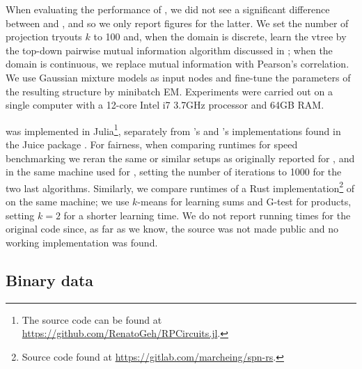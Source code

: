 When evaluating the performance of , we did not see a significant difference
between  and , and so we only report figures for the latter.
We set the number of projection tryouts $k$ to 100 and, when the domain is discrete, learn the
vtree by the top-down pairwise mutual information algorithm discussed in ; when
the domain is continuous, we replace mutual information with Pearson's correlation. We use Gaussian
mixture models as input nodes and fine-tune the parameters of the resulting structure by minibatch
EM. Experiments were carried out on a single computer with a 12-core Intel i7 3.7GHz processor and
64GB RAM.

 was implemented in Julia\footnote{The source code can be found at
\url{https://github.com/RenatoGeh/RPCircuits.jl}.}, separately from 's and
's implementations found in the Juice package \citep{dang21}. For fairness,
when comparing runtimes for speed benchmarking we reran the same or similar setups as originally
reported for ,  and  in the same machine used
for , setting the number of iterations to 1000 for the two last \incrclass{}
algorithms. Similarly, we compare runtimes of a Rust implementation\footnote{Source code found at
\url{https://gitlab.com/marcheing/spn-rs}.} of  on the same machine; we use
$k$-means for learning sums and G-test for products, setting $k=2$ for a shorter learning time. We
do not report running times for the original  code since, as far as we know,
the source was not made public and no working implementation was found.

\subsection{Binary data}

